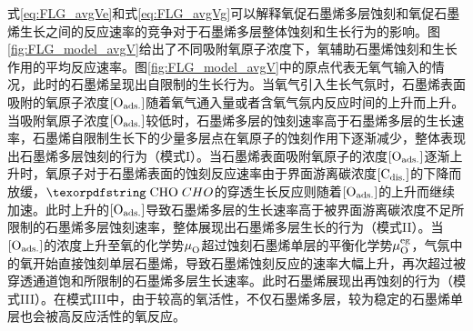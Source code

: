 式\eqref{eq:FLG_avgVe}和式\eqref{eq:FLG_avgVg}可以解释氧促石墨烯多层蚀刻和氧促石墨烯生长之间的反应速率的竞争对于石墨烯多层整体蚀刻和生长行为的影响。图\ref{fig:FLG_model_avgV}给出了不同吸附氧原子浓度下，氧辅助石墨烯蚀刻和生长作用的平均反应速率。图\ref{fig:FLG_model_avgV}中的原点代表无氧气输入的情况，此时的石墨烯呈现出自限制的生长行为。当氧气引入生长气氛时，石墨烯表面吸附的氧原子浓度$\rm{\left[O_{ads.}\right]} \it$随着氧气通入量或者含氧气氛内反应时间的上升而上升。当吸附氧原子浓度$\rm{\left[O_{ads.}\right]} \it$较低时，石墨烯多层的蚀刻速率高于石墨烯多层的生长速率，石墨烯自限制生长下的少量多层点在氧原子的蚀刻作用下逐渐减少，整体表现出石墨烯多层蚀刻的行为（模式I）。当石墨烯表面吸附氧原子的浓度$\rm{\left[O_{ads.}\right]} \it$逐渐上升时，氧原子对于石墨烯表面的蚀刻反应速率由于界面游离碳浓度$\rm{\left[C_{dis.}\right]} \it$的下降而放缓，$\cemb{CHO}$的穿透生长反应则随着$\rm{\left[O_{ads.}\right]} \it$的上升而继续加速。此时上升的$\rm{\left[O_{ads.}\right]} \it$导致石墨烯多层的生长速率高于被界面游离碳浓度不足所限制的石墨烯多层蚀刻速率，整体展现出石墨烯多层生长的行为（模式II）。当$\rm{\left[O_{ads.}\right]} \it$的浓度上升至氧的化学势$\it \mu_{\rm O}^{\rm } \it$超过蚀刻石墨烯单层的平衡化学势$\it \mu_{\rm O}^{\rm eg} \it$，气氛中的氧开始直接蚀刻单层石墨烯，导致石墨烯蚀刻反应的速率大幅上升，再次超过被穿透通道饱和所限制的石墨烯多层生长速率。此时石墨烯展现出再蚀刻的行为（模式III）。在模式III中，由于较高的氧活性，不仅石墨烯多层，较为稳定的石墨烯单层也会被高反应活性的氧反应。

